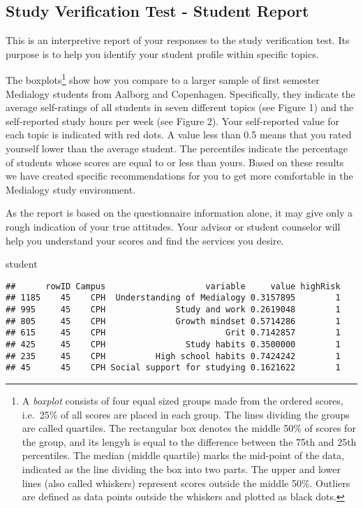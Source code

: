 \documentclass[]{article}
\title{}
\author{}
\date{}
\newenvironment{Shaded}{\begin{snugshade}}{\end{snugshade}}
\newcommand{\NormalTok}[1]{{#1}}
\let\rmarkdownfootnote\footnote%
\def\footnote{\protect\rmarkdownfootnote}
\begin{document}
\subsection{Study Verification Test - Student
Report}\label{study-verification-test---student-report}

This is an interpretive report of your responses to the study
verification test. Its purpose is to help you identify your student
profile within specific topics.

The boxplots\footnote{A \emph{boxplot} consists of four equal sized
  groups made from the ordered scores, i.e.~25\% of all scores are
  placed in each group. The lines dividing the groups are called
  quartiles. The rectangular box denotes the middle 50\% of scores for
  the group, and its lengyh is equal to the difference between the 75th
  and 25th percentiles. The median (middle quartile) marks the mid-point
  of the data, indicated as the line dividing the box into two parts.
  The upper and lower lines (also called whiskers) represent scores
  outside the middle 50\%. Outliers are defined as data points outside
  the whiskers and plotted as black dots.} show how you compare to a
larger sample of first semester Medialogy students from Aalborg and
Copenhagen. Specifically, they indicate the average self-ratings of all
students in seven different topics (see Figure 1) and the self-reported
study hours per week (see Figure 2). Your self-reported value for each
topic is indicated with red dots. A value less than 0.5 means that you
rated yourself lower than the average student. The percentiles indicate
the percentage of students whose scores are equal to or less than yours.
Based on these results we have created specific recommendations for you
to get more comfortable in the Medialogy study environment.

As the report is based on the questionnaire information alone, it may
give only a rough indication of your true attitudes. Your advisor or
student counselor will help you understand your scores and find the
services you desire.

\begin{Shaded}
\begin{Highlighting}[]
\NormalTok{student}
\end{Highlighting}
\end{Shaded}

\begin{verbatim}
##      rowID Campus                    variable     value highRisk
## 1185    45    CPH  Understanding of Medialogy 0.3157895        1
## 995     45    CPH              Study and work 0.2619048        1
## 805     45    CPH              Growth mindset 0.5714286        1
## 615     45    CPH                        Grit 0.7142857        1
## 425     45    CPH                Study habits 0.3500000        1
## 235     45    CPH          High school habits 0.7424242        1
## 45      45    CPH Social support for studying 0.1621622        1
\end{verbatim}
\end{document}
